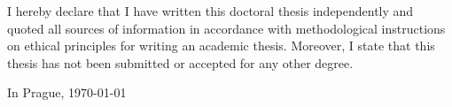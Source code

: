 \begin{declaration}
I hereby declare that I have written this doctoral thesis independently and quoted all sources of information in accordance with methodological instructions on ethical principles for writing an academic thesis. Moreover, I state that this thesis has not been submitted or accepted for any other degree.

In Prague, \today
\end{declaration}

\begin{abstract-english}



\end{abstract-english}

\begin{abstract-czech}

\end{abstract-czech}


\hypersetup{hidelinks}
